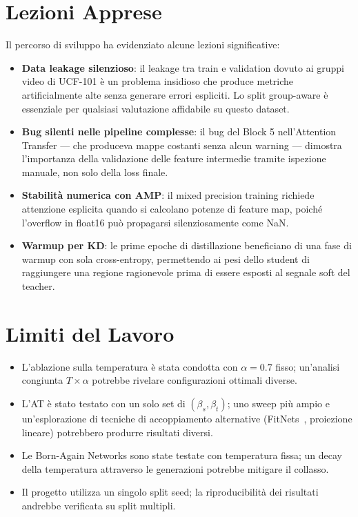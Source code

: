 \section{Lezioni Apprese}

Il percorso di sviluppo ha evidenziato alcune lezioni significative:

\begin{itemize}
    \item \textbf{Data leakage silenzioso}: il leakage tra train e validation dovuto ai gruppi video di UCF-101 è un problema insidioso che produce metriche artificialmente alte senza generare errori espliciti. Lo split group-aware è essenziale per qualsiasi valutazione affidabile su questo dataset.
    
    \item \textbf{Bug silenti nelle pipeline complesse}: il bug del Block 5 nell'Attention Transfer --- che produceva mappe costanti senza alcun warning --- dimostra l'importanza della validazione delle feature intermedie tramite ispezione manuale, non solo della loss finale.
    
    \item \textbf{Stabilità numerica con AMP}: il mixed precision training richiede attenzione esplicita quando si calcolano potenze di feature map, poiché l'overflow in float16 può propagarsi silenziosamente come NaN.
    
    \item \textbf{Warmup per KD}: le prime epoche di distillazione beneficiano di una fase di warmup con sola cross-entropy, permettendo ai pesi dello student di raggiungere una regione ragionevole prima di essere esposti al segnale soft del teacher.
\end{itemize}

\section{Limiti del Lavoro}

\begin{itemize}
    \item L'ablazione sulla temperatura è stata condotta con $\alpha = 0.7$ fisso; un'analisi congiunta $T \times \alpha$ potrebbe rivelare configurazioni ottimali diverse.
    \item L'AT è stato testato con un solo set di $(\beta_s, \beta_t)$; uno sweep più ampio e un'esplorazione di tecniche di accoppiamento alternative (FitNets~\cite{romero2015fitnets}, proiezione lineare) potrebbero produrre risultati diversi.
    \item Le Born-Again Networks sono state testate con temperatura fissa; un decay della temperatura attraverso le generazioni potrebbe mitigare il collasso.
    \item Il progetto utilizza un singolo split seed; la riproducibilità dei risultati andrebbe verificata su split multipli.
\end{itemize}

